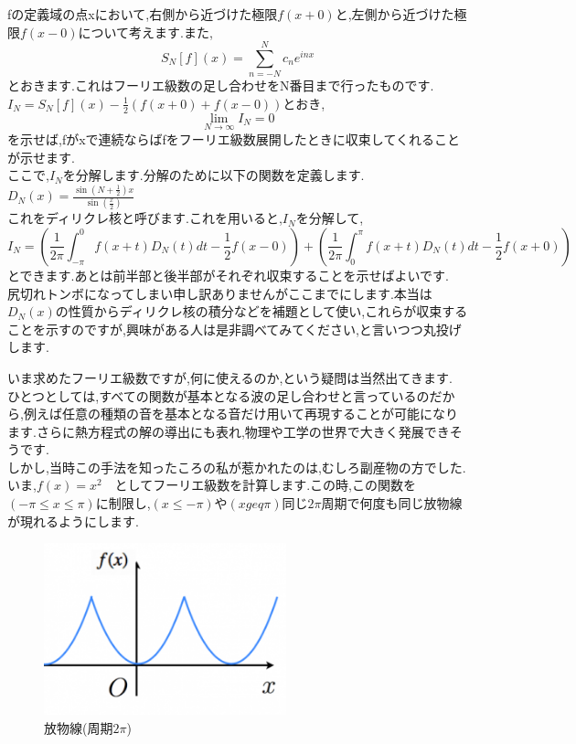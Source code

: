 fの定義域の点xにおいて,右側から近づけた極限$f(x+0)$と,左側から近づけた極限$f(x-0)$について考えます.また,
\[
  S_N[f](x) = \sum_{n=-N}^N c_n e^{inx}
\]
とおきます.これはフーリエ級数の足し合わせをN番目まで行ったものです.\\
$I_N = S_N[f](x) - \frac{1}{2}(f(x+0)+f(x-0))$とおき,
\[
  \lim_{N \to \infty} I_N = 0
\]
を示せば,fがxで連続ならばfをフーリエ級数展開したときに収束してくれることが示せます.\\
ここで,$I_N$を分解します.分解のために以下の関数を定義します.\\
$D_N(x) = \frac{\sin(N + \frac{1}{2})x}{\sin(\frac{x}{2})}$\\
これをディリクレ核と呼びます.これを用いると,$I_N$を分解して,
\[
  I_N = (\frac{1}{2\pi} \int_{-\pi}^0 f(x+t) D_N(t) dt - \frac{1}{2} f(x-0)) +  (\frac{1}{2\pi} \int_0^\pi f(x+t) D_N(t) dt - \frac{1}{2} f(x+0))
\]
とできます.あとは前半部と後半部がそれぞれ収束することを示せばよいです.\\
尻切れトンボになってしまい申し訳ありませんがここまでにします.本当は$D_N(x)$の性質からディリクレ核の積分などを補題として使い,これらが収束することを示すのですが,興味がある人は是非調べてみてください,と言いつつ丸投げします.

いま求めたフーリエ級数ですが,何に使えるのか,という疑問は当然出てきます.\\
ひとつとしては,すべての関数が基本となる波の足し合わせと言っているのだから,例えば任意の種類の音を基本となる音だけ用いて再現することが可能になります.さらに熱方程式の解の導出にも表れ,物理や工学の世界で大きく発展できそうです.\\
しかし,当時この手法を知ったころの私が惹かれたのは,むしろ副産物の方でした.\\
いま,$f(x) = x^2$　としてフーリエ級数を計算します.この時,この関数を$({-\pi} \leq x \leq \pi)$に制限し,$(x \leq -\pi)$や$(x geq \pi)$同じ${2\pi}$周期で何度も同じ放物線が現れるようにします.\\

\begin{figure}[h]
  \begin{center}
    \includegraphics[clip,width=7.0cm]{osawa.png}
    \caption{放物線(周期$2\pi$)}
    \label{f_para}
  \end{center}
\end{figure}

